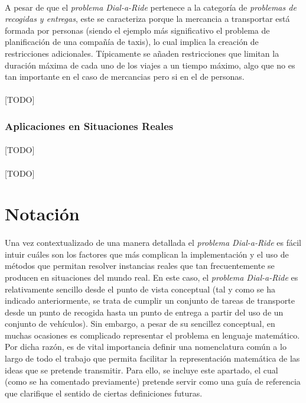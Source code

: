 \documentclass{subfiles}
\begin{document}
        \paragraph{}
        A pesar de que el \emph{problema Dial-a-Ride} pertenece a la categoría de \emph{problemas de recogidas y entregas}, este se caracteriza porque la mercancia a transportar está formada por personas (siendo el ejemplo más significativo el problema de planificación de una compañía de taxis), lo cual implica la creación de restricciones adicionales. Típicamente se añaden restricciones que limitan la duración máxima de cada uno de los viajes a un tiempo máximo, algo que no es tan importante en el caso de mercancias pero si en el de personas.

        \paragraph{}
        [TODO]

        \subsubsection{Aplicaciones en Situaciones Reales}
        \label{sec:formulation_dial_a_ride_applications}

          \paragraph{}
          [TODO]

        \paragraph{}
        [TODO]

    \section{Notación}
    \label{sec:formulation_notation}

      \paragraph{}
      Una vez contextualizado de una manera detallada el \emph{problema Dial-a-Ride} es fácil intuir cuáles son los factores que más complican la implementación y el uso de métodos que permitan resolver instancias reales que tan frecuentemente se producen en situaciones del mundo real. En este caso, el \emph{problema Dial-a-Ride} es relativamente sencillo desde el punto de vista conceptual (tal y como se ha indicado anteriormente, se trata de cumplir un conjunto de tareas de transporte desde un punto de recogida hasta un punto de entrega a partir del uso de un conjunto de vehículos). Sin embargo, a pesar de su sencillez conceptual, en muchas ocasiones es complicado representar el problema en lenguaje matemático. Por dicha razón, es de vital importancia definir una nomenclatura común a lo largo de todo el trabajo que permita facilitar la representación matemática de las ideas que se pretende transmitir. Para ello, se incluye este apartado, el cual (como se ha comentado previamente) pretende servir como una guía de referencia que clarifique el sentido de ciertas definiciones futuras.
\end{document}
